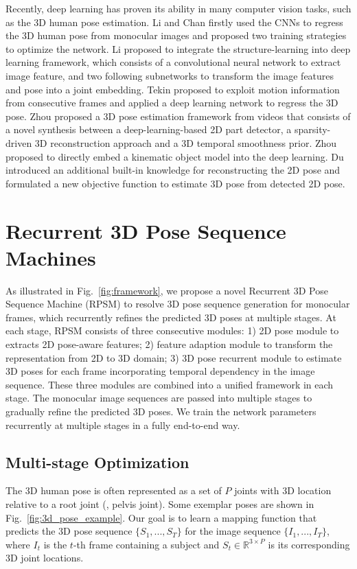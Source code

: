 \documentclass[10pt,twocolumn,letterpaper]{article}
\begin{document}
Recently, deep learning has proven its ability in many computer vision tasks, such as the 3D human pose estimation. Li and Chan \cite{li20143d} firstly used the CNNs to regress the 3D human pose from monocular images and proposed two training strategies to optimize the network. Li \etal \cite{li2015maximum} proposed to integrate the structure-learning into deep learning framework, which consists of a convolutional neural network to extract image feature, and two following subnetworks to transform the image features and pose into a joint embedding. Tekin \etal \cite{Tekin_2016_CVPR} proposed to exploit motion information from consecutive frames and applied a deep learning network to regress the 3D pose. Zhou \etal \cite{zhou2015sparseness} proposed a 3D pose estimation framework from videos that consists of a novel synthesis between a deep-learning-based 2D part detector, a sparsity-driven 3D reconstruction approach and a 3D temporal smoothness prior. Zhou \etal \cite{zhou2016deep} proposed to directly embed a kinematic object model into the deep learning. Du \etal \cite{DBLP:conf/eccv/DuWLHGWKG16} introduced an additional built-in knowledge for reconstructing the 2D pose and formulated a new objective function to estimate 3D pose from detected 2D pose.



\section{Recurrent 3D Pose Sequence Machines}
As illustrated in Fig.~\ref{fig:framework}, we propose a novel Recurrent 3D Pose Sequence Machine (RPSM) to resolve 3D pose sequence generation for monocular frames, which recurrently refines the predicted 3D poses at multiple stages. At each stage, RPSM consists of three consecutive modules: 1) 2D pose module to extracts 2D pose-aware features; 2) feature adaption module to transform the representation from 2D to 3D domain; 3) 3D pose recurrent module to estimate 3D poses for each frame incorporating temporal dependency in the image sequence. These three modules are combined into a unified framework in each stage. The monocular image sequences are passed into multiple stages to gradually refine the predicted 3D poses. We train the network parameters recurrently at multiple stages in a fully end-to-end way.

\subsection{Multi-stage Optimization}
The 3D human pose is often represented as a set of $P$ joints with 3D location relative to a root joint (\eg, pelvis joint). Some exemplar poses are shown in Fig.~\ref{fig:3d_pose_example}. Our goal is to learn a mapping function that predicts the 3D pose sequence $\{S_1,...,S_T\}$ for the image sequence $\{I_1,...,I_T\}$, where $I_t$ is the $t$-th frame containing a subject and $S_t \in \mathbb{R}^{3\times{P}}$ is its corresponding 3D joint locations. 
\end{document}
